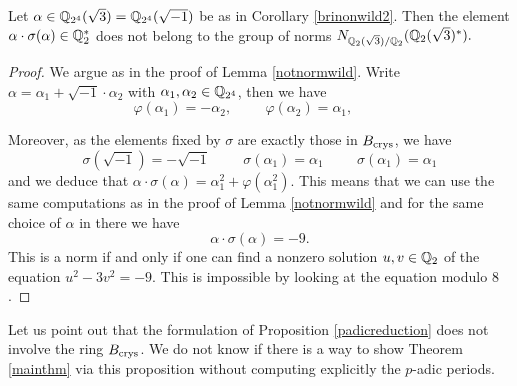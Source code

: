 \documentclass[11pt]{amsart}
\begin{document}
\begin{lemma}\label{notnormwild2}
Let $\alpha \in \mathbb{Q}_{2^4}(\sqrt{3})=\mathbb{Q}_{2^4}(\sqrt{-1})$ be as in Corollary \ref{brinonwild2}. Then the element $\alpha  \cdot \sigma(\alpha) \in \mathbb{Q}_2^*$ does not belong to the group of norms $ N_{\mathbb{Q}_2(\sqrt{3})/\mathbb{Q}_2}(\mathbb{Q}_2(\sqrt{3})^*).$
\end{lemma}
\begin{proof}
 We argue as in the proof of Lemma \ref{notnormwild}. Write $\alpha= \alpha_1+\sqrt{-1}\cdot \alpha_2$ with $\alpha_1,\alpha_2 \in \mathbb{Q}_{2^4}$, then we have
\[\varphi(\alpha_1)=-\alpha_2,  \hspace{1cm} \varphi(\alpha_2)=\alpha_1, \hspace{1cm}\]

 Moreover, as the elements fixed by $\sigma$ are exactly those in $B_{\textnormal{crys}}$, we have
 \[ \sigma(\sqrt{-1})=-\sqrt{-1} \hspace{1cm} \sigma(\alpha_1)= \alpha_1 \hspace{1cm} \sigma(\alpha_1)= \alpha_1 \]
 and we deduce that $\alpha  \cdot \sigma(\alpha)=\alpha_1^2+\varphi(\alpha_1^2).$ This means that we can use the same computations as in  the proof of Lemma \ref{notnormwild} and for the same choice of $\alpha$ in there we have \[\alpha  \cdot \sigma(\alpha) = -9.\]
This is a norm if and only if one can find a nonzero solution $u,v \in \mathbb{Q}_2$ of the equation $u^2 - 3 v^2=-9$. This is impossible by looking at the equation modulo $8$.
\end{proof}

\begin{remark}
Let us point out that the formulation of Proposition \ref{padicreduction} does not involve the ring $B_{\textnormal{crys}}$. We do not know if there is a way to show Theorem \ref{mainthm} via   this proposition without computing explicitly the $p$-adic periods.
\end{remark}
\end{document}
